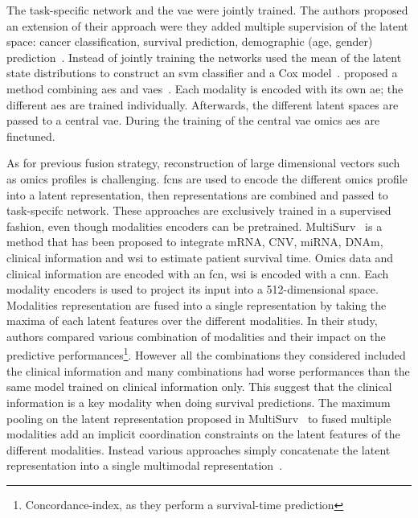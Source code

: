 \documentclass[../main.tex]{subfiles}
\begin{document}
			The task-specific network and the \gls{vae} were jointly trained.
			The authors proposed an extension of their approach were they added multiple supervision of the latent space: cancer classification, survival prediction, demographic (age, gender) prediction~\cite{Zhang2021}.
			Instead of jointly training the networks \citeauthor{Hira2021} used the mean of the latent state distributions to construct an \gls{svm} classifier and a Cox model~\cite{Hira2021}.
			\citeauthor{customics} proposed a method combining \glspl{ae} and \glspl{vae}~\cite{customics}.
			Each modality is encoded with its own \gls{ae}; the different \glspl{ae} are trained individually.
			Afterwards, the different latent spaces are passed to a central \gls{vae}.
			During the training of the central \gls{vae} omics \glspl{ae} are finetuned.

			As for previous fusion strategy, reconstruction of large dimensional vectors such as omics profiles is challenging.
			\Glspl{fcn} are used to encode the different omics profile into a latent representation, then representations are combined and passed to task-specifc network.
			These approaches are exclusively trained in a supervised fashion, even though modalities encoders can be pretrained.
			MultiSurv~\cite{MultiSurv} is a method that has been proposed to integrate mRNA, CNV, miRNA, DNAm, clinical information and \gls{wsi} to estimate patient survival time.
			Omics data and clinical information are encoded with an \gls{fcn}, \gls{wsi} is encoded with a \gls{cnn}.
			Each modality encoders is used to project its input into a 512-dimensional space.
			Modalities representation are fused into a single representation by taking the maxima of each latent features over the different modalities.
			In their study, authors compared various combination of modalities and their impact on the predictive performances\footnote{Concordance-index, as they perform a survival-time prediction}.
			However all the combinations they considered included the clinical information and many combinations had worse performances than the same model trained on clinical information only.
			This suggest that the clinical information is a key modality when doing survival predictions.
			The maximum pooling on the latent representation proposed in MultiSurv~\cite{MultiSurv} to fused multiple modalities add an implicit coordination constraints on the latent features of the different modalities.
			Instead various approaches simply concatenate the latent representation into a single multimodal representation~\cite{MOLI,Lin2020}.
\end{document}
